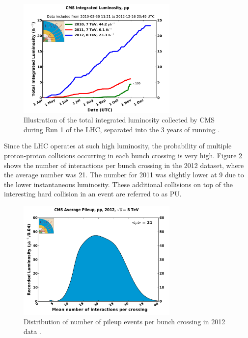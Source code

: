 \begin{figure}[htbp]
   \includegraphics[width=0.7\textwidth]{plots/detector/int_lumi_cumulative_pp_2.pdf}
\caption[Illustration of the total integrated luminosity delivered to CMS during
Run 1 of the LHC.]{Illustration of the total integrated luminosity collected by
CMS during Run 1 of the LHC, separated into the 3 years of running \cite{cmslumitwiki}.}
\label{fig:detlumi}
\end{figure}

Since the LHC operates at such high luminosity, the probability of multiple
proton-proton collisions occurring in each bunch crossing is very high. Figure 
\ref{fig:PU} shows the number of interactions per bunch crossing in the
2012 dataset, where the average number was 21. The number for 2011 was slightly
lower at 9 due to the lower instantaneous luminosity. 
These additional collisions on top of the interesting hard collision
in an event are referred to as \ac{PU}.

\begin{figure}[htbp]
   \includegraphics[width=0.7\textwidth]{plots/detector/pileup_pp_2012-2.pdf}
\caption[Distribution of number of pileup events per bunch crossing in 2012
data.]{Distribution of number of pileup events per bunch crossing in 2012 data \cite{cmslumitwiki}.}
\label{fig:PU}
\end{figure}

